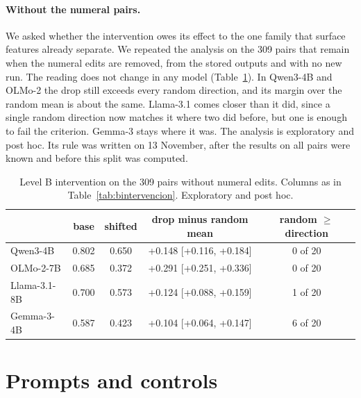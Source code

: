 \documentclass[10pt]{article}
\begin{document}
\paragraph{Without the numeral pairs.} We asked whether the intervention owes its effect to the one family that
surface features already separate. We repeated the analysis on the 309 pairs that remain when the numeral edits are
removed, from the stored outputs and with no new run. The reading does not change in any model
(Table~\ref{tab:bsinc2}). In Qwen3-4B and OLMo-2 the drop still exceeds every random direction, and its margin over
the random mean is about the same. Llama-3.1 comes closer than it did, since a single random direction now matches it
where two did before, but one is enough to fail the criterion. Gemma-3 stays where it was. The analysis is exploratory
and post hoc. Its rule was written on 13 November, after the results on all pairs were known and before this split was
computed.

\begin{table}[h]
\centering
\caption{Level B intervention on the 309 pairs without numeral edits. Columns as in Table~\ref{tab:bintervencion}. Exploratory and post hoc.}
\label{tab:bsinc2}
\vspace{2pt}
{\footnotesize
\begin{tabular}{@{}lcccc@{}}
\toprule
 & base & shifted & drop minus random mean & random $\geq$ direction\\
\midrule
Qwen3-4B     & 0.802 & 0.650 & +0.148 [+0.116, +0.184] & 0 of 20\\
OLMo-2-7B    & 0.685 & 0.372 & +0.291 [+0.251, +0.336] & 0 of 20\\
Llama-3.1-8B & 0.700 & 0.573 & +0.124 [+0.088, +0.159] & 1 of 20\\
Gemma-3-4B   & 0.587 & 0.423 & +0.104 [+0.064, +0.147] & 6 of 20\\
\bottomrule
\end{tabular}}
\end{table}

\section{Prompts and controls}\label{app:definiciones}
\end{document}
